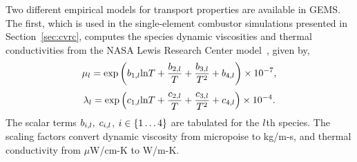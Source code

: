 Two different empirical models for transport properties are available in GEMS. The first, which is used in the single-element combustor simulations presented in Section~\ref{sec:cvrc}, computes the species dynamic viscosities and thermal conductivities from the NASA Lewis Research Center model~\cite{Svehla1995}, given by,
%
\begin{equation}
	\mu_{l} = \text{exp} \left(b_{1,l} \text{ln} T + \frac{b_{2,l}}{T} + \frac{b_{3,l}}{T^2} + b_{4,l} \right) \times 10^{-7},
\end{equation}
%
\begin{equation}
	\lambda_{l} = \text{exp} \left(c_{1,l} \text{ln} T + \frac{c_{2,l}}{T} + \frac{c_{3,l}}{T^2} + c_{4,l} \right) \times 10^{-4}.
\end{equation}
%
The scalar terms $b_{i,l}, \; c_{i,l}$, $i \in \{1 \hdots 4\}$ are tabulated for the $l$th species. The scaling factors convert dynamic viscosity from micropoise to kg/m-s, and thermal conductivity from $\mu$W/cm-K to W/m-K.

